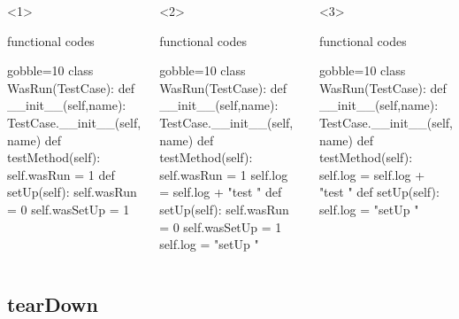 \documentclass[lualatex]{beamer}
\begin{document}
\begin{frame}[fragile,t]
\begin{columns}[t]
    \begin{onlyenv}<1>
      \begin{block}{functional codes}
        \begin{pythoncode*}{gobble=10}
          class WasRun(TestCase):
            def __init__(self,name):
              TestCase.__init__(self, name)
            def testMethod(self):
              self.wasRun = 1
            def setUp(self):
              self.wasRun = 0
              self.wasSetUp = 1
        \end{pythoncode*}
      \end{block}
    \end{onlyenv}
    \begin{onlyenv}<2>
      \begin{block}{functional codes}
        \begin{pythoncode*}{gobble=10}
          class WasRun(TestCase):
            def __init__(self,name):
              TestCase.__init__(self, name)
            def testMethod(self):
              self.wasRun = 1
              self.log = self.log + "test "
            def setUp(self):
              self.wasRun = 0
              self.wasSetUp = 1
              self.log = "setUp "
        \end{pythoncode*}
      \end{block}
    \end{onlyenv}
    \begin{onlyenv}<3>
      \begin{block}{functional codes}
        \begin{pythoncode*}{gobble=10}
          class WasRun(TestCase):
            def __init__(self,name):
              TestCase.__init__(self, name)
            def testMethod(self):
              self.log = self.log + "test "
            def setUp(self):
              self.log = "setUp "
        \end{pythoncode*}
      \end{block}
    \end{onlyenv}
  \end{columns}
\end{frame}

\subsection{tearDown}
\end{document}
